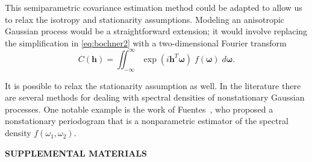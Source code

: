 \documentclass[12pt]{article}
\begin{document}

This semiparametric covariance estimation method could be adapted to allow us to relax the isotropy and stationarity assumptions. Modeling an anisotropic Gaussian process would be a straightforward extension; it would involve replacing the simplification in \eqref{eq:bochner2} with a two-dimensional Fourier transform
\[
  C(\bm{h}) = \iint_{-\infty}^{\infty} \exp(i\bm{h}^T\bm{\omega}) \; f(\bm{\omega}) \; d\bm{\omega}.
\]

It is possible to relax the stationarity assumption as well. In the literature there are several methods for dealing with spectral densities of nonstationary Gaussian processes. One notable example is the work of Fuentes~\cite{fuentes2002spectral}, who proposed a nonstationary periodogram that is a nonparametric estimator of the spectral density $f(\omega_1, \omega_2)$.





\bigskip
\begin{center}
{\large\bf SUPPLEMENTAL MATERIALS}
\end{center}
\end{document}
